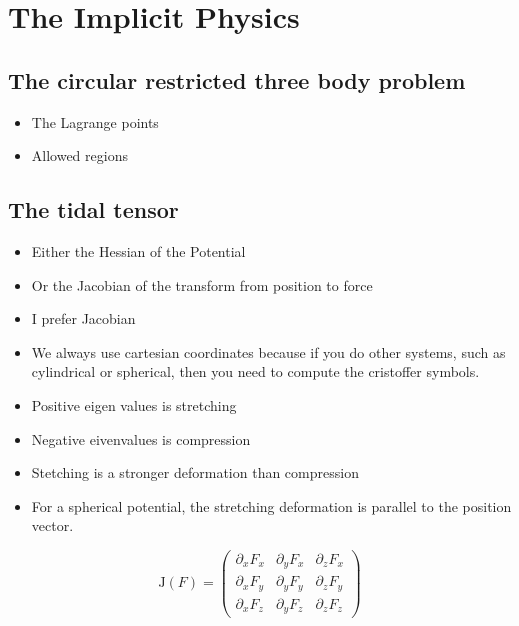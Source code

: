 \section{The Implicit Physics}

    \subsection{The circular restricted three body problem}
        \begin{itemize}
            \item The Lagrange points
            \item Allowed regions 
        \end{itemize}

    \subsection{The tidal tensor}
        \begin{itemize}
            \item Either the Hessian of the Potential
            \item Or the Jacobian of the transform from position to force
            \item I prefer Jacobian
            \item We always use cartesian coordinates because if you do other systems, such as cylindrical or spherical, then you need to compute the cristoffer symbols. 
            \item Positive eigen values is stretching
            \item Negative eivenvalues is compression
            \item Stetching is a stronger deformation than compression
            \item For a spherical potential, the stretching deformation is parallel to the position vector. 
        \end{itemize}
        
        \begin{equation}
            \text{J}(F)= \left(\begin{matrix}
                \partial_x F_x & \partial_y F_x & \partial_z F_x \\
                \partial_x F_y & \partial_y F_y & \partial_z F_y \\
                \partial_x F_z & \partial_y F_z & \partial_z F_z 
            \end{matrix}\right)
        \end{equation}
        
